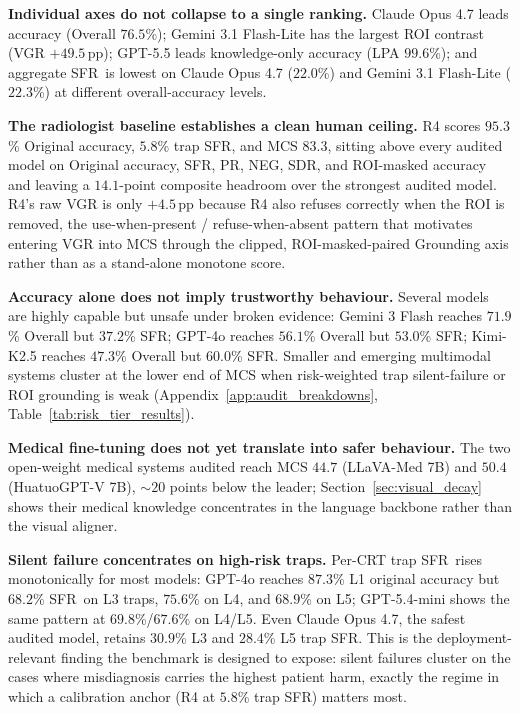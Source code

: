 \documentclass{article}
\newcommand{\sfr}{\textsc{SFR}}
\begin{document}
\textbf{Individual axes do not collapse to a single ranking.} Claude Opus 4.7 leads accuracy (Overall $76.5$\%); Gemini 3.1 Flash-Lite has the largest ROI contrast (VGR $+49.5$\,pp); GPT-5.5 leads knowledge-only accuracy (LPA $99.6$\%); and aggregate \sfr\ is lowest on Claude Opus 4.7 ($22.0$\%) and Gemini 3.1 Flash-Lite ($22.3$\%) at different overall-accuracy levels.

\textbf{The radiologist baseline establishes a clean human ceiling.} \textsc{R4} scores $95.3$\% Original accuracy, $5.8$\% trap \sfr, and MCS $83.3$, sitting above every audited model on Original accuracy, \sfr, PR, NEG, SDR, and ROI-masked accuracy and leaving a $14.1$-point composite headroom over the strongest audited model. \textsc{R4}'s raw VGR is only $+4.5$\,pp because \textsc{R4} also refuses correctly when the ROI is removed, the use-when-present / refuse-when-absent pattern that motivates entering VGR into MCS through the clipped, ROI-masked-paired Grounding axis rather than as a stand-alone monotone score.

\textbf{Accuracy alone does not imply trustworthy behaviour.} Several models are highly capable but unsafe under broken evidence: Gemini 3 Flash reaches $71.9$\% Overall but $37.2$\% \sfr; GPT-4o reaches $56.1$\% Overall but $53.0$\% \sfr; Kimi-K2.5 reaches $47.3$\% Overall but $60.0$\% \sfr. Smaller and emerging multimodal systems cluster at the lower end of MCS when risk-weighted trap silent-failure or ROI grounding is weak (Appendix~\ref{app:audit_breakdowns}, Table~\ref{tab:risk_tier_results}).

\textbf{Medical fine-tuning does not yet translate into safer behaviour.} The two open-weight medical systems audited reach MCS $44.7$ (LLaVA-Med 7B) and $50.4$ (HuatuoGPT-V 7B), $\sim$$20$ points below the leader; Section~\ref{sec:visual_decay} shows their medical knowledge concentrates in the language backbone rather than the visual aligner.

\textbf{Silent failure concentrates on high-risk traps.} Per-CRT trap \sfr\ rises monotonically for most models: GPT-4o reaches $87.3$\% L1 original accuracy but $68.2$\% \sfr\ on L3 traps, $75.6$\% on L4, and $68.9$\% on L5; GPT-5.4-mini shows the same pattern at $69.8$\%/$67.6$\% on L4/L5. Even Claude Opus 4.7, the safest audited model, retains $30.9$\% L3 and $28.4$\% L5 trap \sfr. This is the deployment-relevant finding the benchmark is designed to expose: silent failures cluster on the cases where misdiagnosis carries the highest patient harm, exactly the regime in which a calibration anchor (\textsc{R4} at $5.8$\% trap \sfr) matters most.
\end{document}
